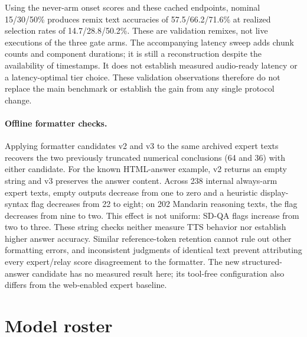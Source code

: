Using the never-arm onset scores and these cached endpoints, nominal
15/30/50\% produces remix text accuracies of 57.5/66.2/71.6\% at
realized selection rates of 14.7/28.8/50.2\%. These are validation
remixes, not live executions of the three gate arms. The accompanying
latency sweep adds chunk counts and component durations; it is still
a reconstruction despite the availability of timestamps. It does not
establish measured audio-ready latency or a latency-optimal tier choice.
These validation observations therefore do not replace the main
benchmark or establish the gain from any single protocol change.

\paragraph{Offline formatter checks.}
Applying formatter candidates v2 and v3 to the same archived expert
texts recovers the two previously truncated numerical conclusions
(64 and 36) with either candidate. For the known HTML-answer example,
v2 returns an empty string and v3 preserves the answer content.
Across 238 internal always-arm expert texts, empty outputs decrease
from one to zero and a heuristic display-syntax flag decreases from
22 to eight; on 202 Mandarin reasoning texts, the flag decreases
from nine to two. This effect is not uniform: SD-QA flags increase
from two to three. These string checks neither measure TTS behavior
nor establish higher answer accuracy. Similar reference-token
retention cannot rule out other formatting errors, and inconsistent
judgments of identical text prevent attributing every expert/relay
score disagreement to the formatter. The new structured-answer
candidate has no measured result here; its tool-free configuration
also differs from the web-enabled expert baseline.

\section{Model roster}
\label{app:models}

